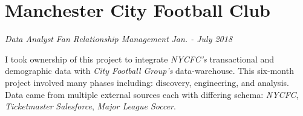 \documentclass[letterpaper,11pt]{article}
\begin{document}
\newpage
\section{Manchester City Football Club}
\textit{Data Analyst}
\hfill
\textit{Fan Relationship Management}
\hfill
\textit{Jan. - July 2018}

\begin{description}[style=multiline,leftmargin=3cm]
	\item[New York City FC Project]
	      I took ownership of this project to integrate \textit{NYCFC's} transactional and demographic data with \textit{City Football Group's} data-warehouse. This six-month project involved many phases including: discovery, engineering, and analysis. Data came from multiple external sources each with differing schema: \textit{NYCFC}, \textit{Ticketmaster} \textit{Salesforce}, \textit{Major League Soccer}.


\end{description}
\end{document}
